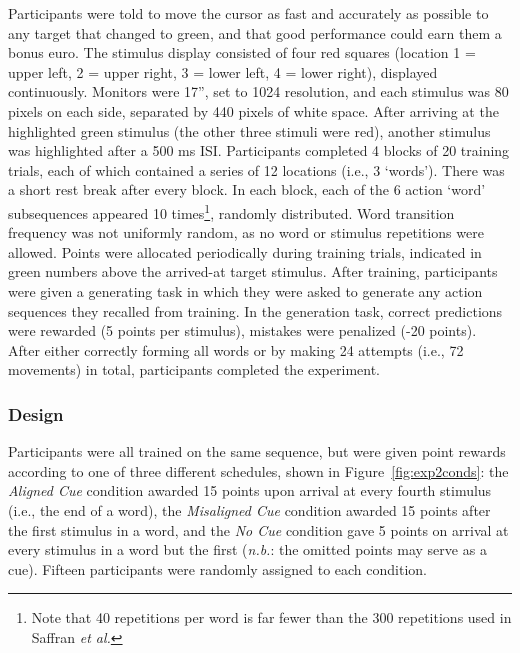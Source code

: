 \documentclass[conference]{IEEEtran}
\begin{document}
Participants were told to move the cursor as fast and accurately as possible to any target that changed to green, and that good performance could earn them a bonus euro. The stimulus display consisted of four red squares (location 1 = upper left, 2 = upper right, 3 = lower left, 4 = lower right), displayed continuously. Monitors were 17'', set to 1024 resolution, and each stimulus was 80 pixels on each side, separated by 440 pixels of white space. After arriving at the highlighted green stimulus (the other three stimuli were red), another stimulus was highlighted after a 500 ms ISI. Participants completed 4 blocks of 20 training trials, each of which contained a series of 12 locations (i.e., 3 `words'). There was a short rest break after every block. In each block, each of the 6 action `word' subsequences appeared 10 times\footnote{Note that 40 repetitions per word is far fewer than the 300 repetitions used in Saffran \textit{et al.}}, randomly distributed. Word transition frequency was not uniformly random, as no word or stimulus repetitions were allowed. Points were allocated periodically during training trials, indicated in green numbers above the arrived-at target stimulus. After training, participants were given a generating task in which they were asked to generate any action sequences they recalled from training.  In the generation task, correct predictions were rewarded (5 points per stimulus), mistakes were penalized (-20 points). After either correctly forming all words or by making 24 attempts (i.e., 72 movements) in total, participants completed the experiment. 

\subsubsection{Design}

Participants were all trained on the same sequence, but were given point rewards according to one of three different schedules, shown in Figure~\ref{fig:exp2conds}: the {\em Aligned Cue} condition awarded 15 points upon arrival at every fourth stimulus (i.e., the end of a word), the {\em Misaligned Cue} condition awarded 15 points after the first stimulus in a word, and the {\em No Cue} condition gave 5 points on arrival at every stimulus in a word but the first ({\em n.b.}: the omitted points may serve as a cue). Fifteen participants were randomly assigned to each condition.
\end{document}
